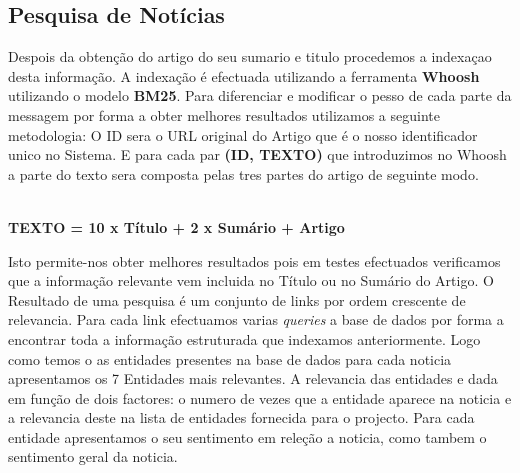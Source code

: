\subsection{Pesquisa de Notícias}
\label{sec:news_search}
\hspace{15pt}Despois da obtenção do artigo do seu sumario e titulo procedemos a indexaçao desta informação. A indexação é efectuada utilizando a ferramenta \textbf{Whoosh} utilizando o modelo \textbf{BM25}. Para diferenciar e modificar o pesso de cada parte da messagem por forma a obter melhores resultados utilizamos a seguinte metodologia: O ID sera o URL original do Artigo que é o nosso identificador unico no Sistema. E para cada par \textbf{(ID, TEXTO)} que introduzimos no Whoosh a parte do texto sera composta pelas tres partes do artigo de seguinte modo.\\\\
\centerline{\textbf{TEXTO = 10 x Título + 2 x Sumário + Artigo}}
\newline\newline
Isto permite-nos obter melhores resultados pois em testes efectuados verificamos que a informação relevante vem incluida no Título ou no Sumário do Artigo. \newline
\hspace{15pt}O Resultado de uma pesquisa é um conjunto de links por ordem crescente de relevancia. Para cada link efectuamos varias \textit{queries} a base de dados por forma a encontrar toda a informação estruturada que indexamos anteriormente. Logo como temos o as entidades presentes na base de dados para cada noticia apresentamos os 7 Entidades mais relevantes. A relevancia das entidades e dada em função de dois factores: o numero de vezes que a entidade aparece na noticia e a relevancia deste na lista de entidades fornecida para o projecto. Para cada entidade apresentamos o seu sentimento em releção a noticia, como tambem o sentimento geral da noticia.